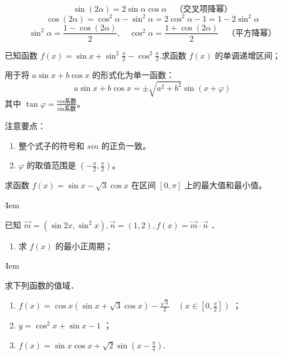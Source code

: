 \begin{theorem}[二倍角公式与降幂公式]
    $$ \sin(2\alpha) = 2\sin\alpha\cos\alpha \quad \text{（交叉项降幂）}$$
    $$ \cos(2\alpha) = \cos^2\alpha - \sin^2\alpha = 2\cos^2\alpha - 1 = 1 - 2\sin^2\alpha $$
    $$ \sin^2\alpha = \frac{1-\cos(2\alpha)}{2}, \quad \cos^2\alpha = \frac{1+\cos(2\alpha)}{2} \quad \text{（平方降幂）}$$
\end{theorem}

\begin{example}
    已知函数 $f(x)=\sin x+\sin ^2 \frac{x}{2}-\cos ^2 \frac{x}{2}$.求函数 $f(x)$ 的单调递增区间；
\end{example}

\vspace{2em}

\begin{theorem}[辅助角公式]
    用于将 $a\sin x + b\cos x$ 的形式化为单一函数：
    $$ a\sin x + b\cos x = \pm \sqrt{a^2+b^2} \sin(x + \varphi) $$
    其中 $\tan\varphi = \frac{\text{cos系数}}{\text{sin系数}}$。

    注意要点：
    \begin{enumerate}
        \item 整个式子的符号和 $sin$ 的正负一致。
        \item $\varphi$ 的取值范围是 $(-\frac{\pi}{2}, \frac{\pi}{2})$。
    \end{enumerate}
\end{theorem}

\begin{example}
    求函数 $f(x) = \sin x - \sqrt{3}\cos x$ 在区间 $[0, \pi]$ 上的最大值和最小值。
\end{example}

\v{4em}

\begin{example}
    已知 $\overrightarrow{m}=\left(\sin 2 x, \sin ^2 x\right), \overrightarrow{n}=(1,2), f(x)=\overrightarrow{m} \cdot \overrightarrow{n}$ ．
    \begin{enumerate}
        \item 求 $f(x)$ 的最小正周期；
    \end{enumerate}
\end{example}

\v{4em}

\begin{example}
    求下列函数的值域．
    \begin{enumerate}
        \item $f(x)=\cos x(\sin x+\sqrt{3} \cos x)-\frac{\sqrt{3}}{2} \quad\left(x \in\left[0, \frac{\pi}{2}\right]\right)$ ；
        \item $y=\cos ^2 x+\sin x-1$ ；
        \item $f(x)=\sin x \cos x+\sqrt{2} \sin \left(x-\frac{\pi}{4}\right)$.
    \end{enumerate}
\end{example}
\vspace{4em}

\vspace{2em}